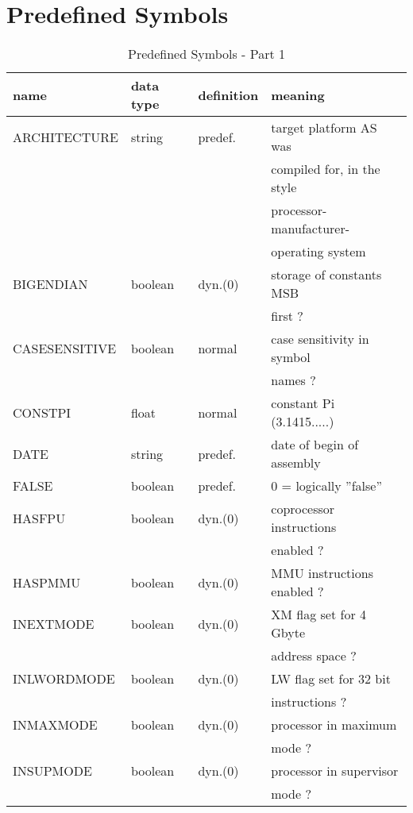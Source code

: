 \documentclass[12pt,twoside]{report}
\begin{document}

\cleardoublepage
\chapter{Predefined Symbols}
\label{AppInternSyms}

\begin{table*}[htb]
\begin{center}\begin{tabular}{|l|l|l|l|}
\hline
name          & data type & definition & meaning \\
\hline
\hline
ARCHITECTURE  & string    & predef.    & target platform AS was \\
              &           &            & compiled for, in the style \\
              &           &            & processor-manufacturer- \\
              &           &            & operating system \\
BIGENDIAN     & boolean   & dyn.(0)    & storage of constants MSB \\
              &           &            & first ? \\
CASESENSITIVE & boolean   & normal     & case sensitivity in symbol \\
              &           &            & names ? \\
CONSTPI       & float     & normal     & constant Pi (3.1415.....) \\
DATE          & string    & predef.    & date of begin of assembly \\
FALSE         & boolean   & predef.    & 0 = logically ''false'' \\
HASFPU        & boolean   & dyn.(0)    & coprocessor instructions \\
              &           &            & enabled ? \\
HASPMMU       & boolean   & dyn.(0)    & MMU instructions enabled ? \\
INEXTMODE     & boolean   & dyn.(0)    & XM flag set for 4 Gbyte \\
              &           &            & address space ? \\
INLWORDMODE   & boolean   & dyn.(0)    & LW flag set for 32 bit \\
              &           &            & instructions ? \\
INMAXMODE     & boolean   & dyn.(0)    & processor in maximum \\
              &           &            & mode ? \\
INSUPMODE     & boolean   & dyn.(0)    & processor in supervisor \\
              &           &            & mode ? \\
\hline
\end{tabular}\end{center}
\caption{Predefined Symbols - Part 1\label{TabInternSyms1}}
\end{table*}
\end{document}
